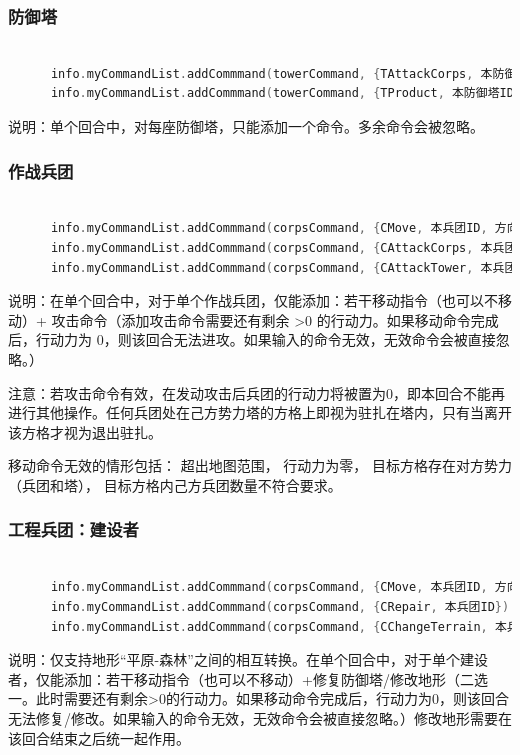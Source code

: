 \documentclass[a4paper,4pt]{article}
\begin{document}
\subsubsection{防御塔}
\begin{lstlisting}[language={C++}]  %插入代码块
      
      info.myCommandList.addCommmand(towerCommand, {TAttackCorps, 本防御塔ID, 目标兵团ID})  //防御塔攻击兵团
      info.myCommandList.addCommmand(towerCommand, {TProduct, 本防御塔ID, 生产任务类型(见下方枚举类型)})  //防御塔设定生产任务
\end{lstlisting}
说明：单个回合中，对每座防御塔，只能添加一个命令。多余命令会被忽略。

\subsubsection{作战兵团}
\begin{lstlisting}[language={C++}]  %插入代码块
      
      info.myCommandList.addCommmand(corpsCommand, {CMove, 本兵团ID, 方向(Cup / Cdown / Cleft / Cright)})  //移动
      info.myCommandList.addCommmand(corpsCommand, {CAttackCorps, 本兵团ID, 目标兵团ID})  //兵团攻击兵团
      info.myCommandList.addCommmand(corpsCommand, {CAttackTower, 本兵团ID, 目标防御塔ID})  //兵团攻击防御塔
\end{lstlisting}

说明：在单个回合中，对于单个作战兵团，仅能添加：若干移动指令（也可以不移动）+ 攻击命令（添加攻击命令需要还有剩余 >0 的行动力。如果移动命令完成后，行动力为 0，则该回合无法进攻。如果输入的命令无效，无效命令会被直接忽略。）

注意：若攻击命令有效，在发动攻击后兵团的行动力将被置为0，即本回合不能再进行其他操作。任何兵团处在己方势力塔的方格上即视为驻扎在塔内，只有当离开该方格才视为退出驻扎。\par

移动命令无效的情形包括：
超出地图范围，
行动力为零，
目标方格存在对方势力（兵团和塔），
目标方格内己方兵团数量不符合要求。

\subsubsection{工程兵团：建设者}
\begin{lstlisting}[language={C++}]  %插入代码块
          
      info.myCommandList.addCommmand(corpsCommand, {CMove, 本兵团ID, 方向(Cup / Cdown / Cleft / Cright)})  //移动
      info.myCommandList.addCommmand(corpsCommand, {CRepair, 本兵团ID})  //修复防御塔
      info.myCommandList.addCommmand(corpsCommand, {CChangeTerrain, 本兵团ID, 目标地形(枚举类型)})  //修改地形
\end{lstlisting}
说明：仅支持地形“平原-森林”之间的相互转换。在单个回合中，对于单个建设者，仅能添加：若干移动指令（也可以不移动）+修复防御塔/修改地形（二选一。此时需要还有剩余>0的行动力。如果移动命令完成后，行动力为0，则该回合无法修复/修改。如果输入的命令无效，无效命令会被直接忽略。）修改地形需要在该回合结束之后统一起作用。
\end{document}
